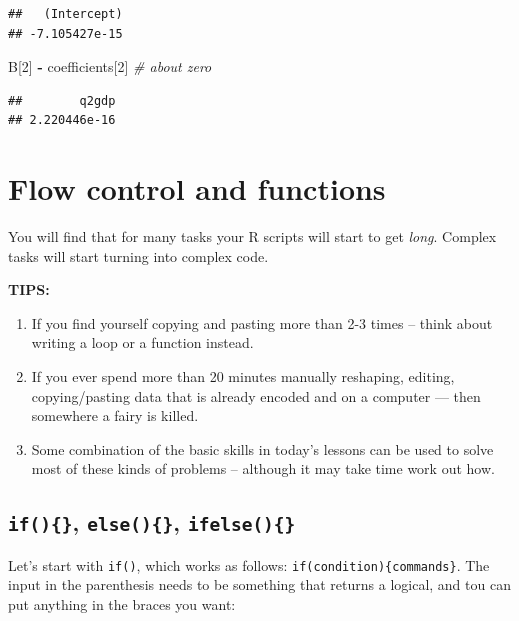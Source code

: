 \documentclass[]{article}
\newenvironment{Shaded}{\begin{snugshade}}{\end{snugshade}}
\newcommand{\DecValTok}[1]{\textcolor[rgb]{0.00,0.00,0.81}{#1}}
\newcommand{\StringTok}[1]{\textcolor[rgb]{0.31,0.60,0.02}{#1}}
\newcommand{\CommentTok}[1]{\textcolor[rgb]{0.56,0.35,0.01}{\textit{#1}}}
\newcommand{\OperatorTok}[1]{\textcolor[rgb]{0.81,0.36,0.00}{\textbf{#1}}}
\newcommand{\NormalTok}[1]{#1}
\providecommand{\tightlist}{%
  \setlength{\itemsep}{0pt}\setlength{\parskip}{0pt}}
\begin{document}
\begin{verbatim}
##   (Intercept) 
## -7.105427e-15
\end{verbatim}

\begin{Shaded}
\begin{Highlighting}[]
\NormalTok{B[}\DecValTok{2}\NormalTok{] }\OperatorTok{-}\StringTok{ }\NormalTok{coefficients[}\DecValTok{2}\NormalTok{] }\CommentTok{# about zero}
\end{Highlighting}
\end{Shaded}

\begin{verbatim}
##        q2gdp 
## 2.220446e-16
\end{verbatim}

\clearpage

\section{Flow control and functions}\label{flow-control-and-functions}

You will find that for many tasks your R scripts will start to get
\emph{long}. Complex tasks will start turning into complex code.

\textbf{TIPS:}

\begin{enumerate}
\def\labelenumi{\arabic{enumi}.}
\tightlist
\item
  If you find yourself copying and pasting more than 2-3 times -- think
  about writing a loop or a function instead.
\item
  If you ever spend more than 20 minutes manually reshaping, editing,
  copying/pasting data that is already encoded and on a computer ---
  then somewhere a fairy is killed.
\item
  Some combination of the basic skills in today's lessons can be used to
  solve most of these kinds of problems -- although it may take time
  work out how.
\end{enumerate}

\clearpage

\subsection{\texorpdfstring{\texttt{if()\{\}}, \texttt{else()\{\}},
\texttt{ifelse()\{\}}}{if()\{\}, else()\{\}, ifelse()\{\}}}\label{if-else-ifelse}

Let's start with \texttt{if()}, which works as follows:
\texttt{if(condition)\{commands\}}. The input in the parenthesis needs
to be something that returns a logical, and tou can put anything in the
braces you want:
\end{document}
